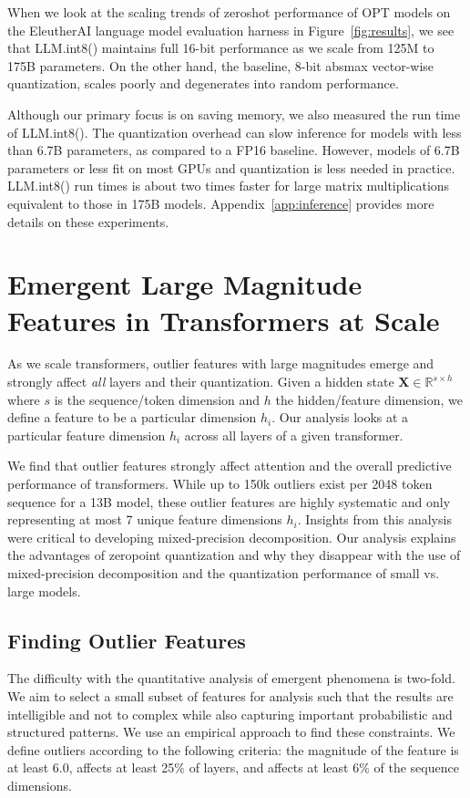 When we look at the scaling trends of zeroshot performance of OPT models on the EleutherAI language model evaluation harness in Figure~\ref{fig:results}, we see that LLM.int8() maintains full 16-bit performance as we scale from 125M to 175B parameters. On the other hand, the baseline, 8-bit absmax vector-wise quantization, scales poorly and degenerates into random performance.

Although our primary focus is on saving memory, we also measured the run time of LLM.int8(). The quantization overhead can slow inference for models with less than 6.7B parameters, as compared to a FP16 baseline. However, models of 6.7B parameters or less fit on most GPUs and quantization is less needed in practice. LLM.int8() run times is about two times faster for large matrix multiplications equivalent to those in 175B models. Appendix~\ref{app:inference} provides more details on these experiments. 

\section{Emergent Large Magnitude Features in Transformers at Scale}
\label{sec:emergence}

As we scale transformers, outlier features with large magnitudes emerge and strongly affect {\it all} layers and their quantization. Given a hidden state $\mathbf{X}\in \mathbb{R}^{s\times h}$ where $s$ is the sequence/token dimension and $h$ the hidden/feature dimension, we define a feature to be a particular dimension $h_i$. Our analysis looks at a particular feature dimension $h_i$ across all layers of a given transformer.

We find that outlier features strongly affect attention and the overall predictive performance of transformers. While up to 150k outliers exist per 2048 token sequence for a 13B model, these outlier features are highly systematic and only representing at most 7 unique feature dimensions $h_i$. Insights from this analysis were critical to developing mixed-precision decomposition. Our analysis explains the advantages of zeropoint quantization and why they disappear with the use of mixed-precision decomposition and the quantization performance of small vs. large models.

\subsection{Finding Outlier Features}

The difficulty with the quantitative analysis of emergent phenomena is two-fold. We aim to select a small subset of features for analysis such that the results are intelligible and not to complex while also capturing important probabilistic and structured patterns. We use an empirical approach to find these constraints. We define outliers according to the following criteria: the magnitude of the feature is at least 6.0, affects at least 25\% of layers, and affects at least 6\% of the sequence dimensions. 

